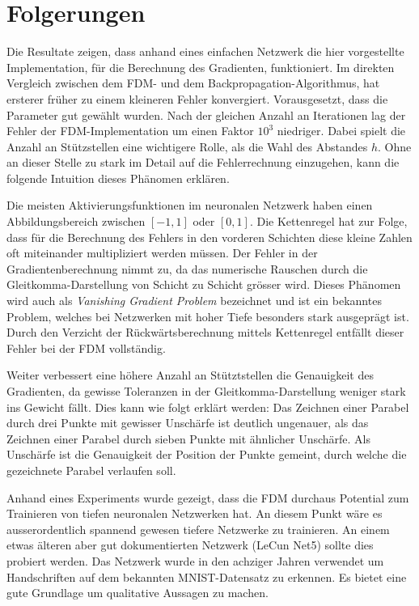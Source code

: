 %
%
%
\section{Folgerungen
\label{ableitung:section:folgerungen}}
Die Resultate zeigen, dass anhand eines einfachen Netzwerk die hier vorgestellte Implementation, für die Berechnung des Gradienten, funktioniert.
Im direkten Vergleich zwischen dem FDM- und dem Backpropagation-Algorithmus, hat ersterer früher zu einem kleineren Fehler konvergiert. Vorausgesetzt, dass die Parameter gut gewählt wurden. Nach der gleichen Anzahl an Iterationen lag der Fehler der FDM-Implementation um einen Faktor $10^3$ niedriger. Dabei spielt die Anzahl an Stützstellen eine wichtigere Rolle, als die Wahl des Abstandes $h$. Ohne an dieser Stelle zu stark im Detail auf die Fehlerrechnung einzugehen, kann die folgende Intuition dieses Phänomen erklären.

Die meisten Aktivierungsfunktionen im neuronalen Netzwerk haben einen Abbildungsbereich zwischen $[-1, 1]$ oder $[0, 1]$. Die Kettenregel hat zur Folge, dass für die Berechnung des Fehlers in den vorderen Schichten diese kleine Zahlen oft miteinander multipliziert werden müssen. Der Fehler in der Gradientenberechnung nimmt zu, da das numerische Rauschen durch die Gleitkomma-Darstellung von Schicht zu Schicht grösser wird. Dieses Phänomen wird auch als \textit{Vanishing Gradient Problem} bezeichnet und ist ein bekanntes Problem, welches bei Netzwerken mit hoher Tiefe besonders stark ausgeprägt ist. Durch den Verzicht der Rückwärtsberechnung mittels Kettenregel entfällt dieser Fehler bei der FDM vollständig. 

Weiter verbessert eine höhere Anzahl an Stütztstellen die Genauigkeit des Gradienten, da gewisse Toleranzen in der Gleitkomma-Darstellung weniger stark ins Gewicht fällt. Dies kann wie folgt erklärt werden: Das Zeichnen einer Parabel durch drei Punkte mit gewisser Unschärfe ist deutlich ungenauer, als das Zeichnen einer Parabel durch sieben Punkte mit ähnlicher Unschärfe. Als Unschärfe ist die Genauigkeit der Position der Punkte gemeint, durch welche die gezeichnete Parabel verlaufen soll.

Anhand eines Experiments wurde gezeigt, dass die FDM durchaus Potential zum Trainieren von tiefen neuronalen Netzwerken hat. An diesem Punkt wäre es ausserordentlich spannend gewesen tiefere Netzwerke zu trainieren. An einem etwas älteren aber gut dokumentierten Netzwerk (LeCun Net5) sollte dies probiert werden. Das Netzwerk wurde in den achziger Jahren verwendet um Handschriften auf dem bekannten MNIST-Datensatz zu erkennen. Es bietet eine gute Grundlage um qualitative Aussagen zu machen. 


